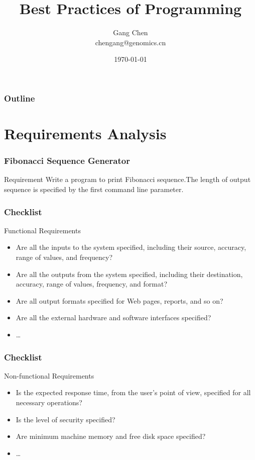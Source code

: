 \documentclass[UTF8]{beamer}
\title{Best Practices of Programming}
\author{Gang Chen\\ chengang@genomics.cn}
\date{\today}
\begin{document}
\begin{frame}
\titlepage
\end{frame}

\begin{frame}[t]\frametitle{Outline}
\tableofcontents[hideallsubsections]
\end{frame}

\section{Requirements Analysis}

\begin{frame}
    \frametitle{Fibonacci Sequence Generator}
\begin{block}{Requirement}
Write a program to print Fibonacci sequence.The length of output sequence is specified by the first command line parameter.
\end{block}
\end{frame}

\begin{frame}
    \frametitle{Checklist}
    \begin{block}{Functional Requirements}
        \begin{itemize}
            \item Are all the inputs to the system specified, including their source, accuracy, range of values, and frequency?
            \item Are all the outputs from the system specified, including their destination, accuracy, range of values, frequency, and format?
            \item Are all output formats specified for Web pages, reports, and so on?
            \item Are all the external hardware and software interfaces specified?
            \item \ldots
        \end{itemize}
    \end{block}
\end{frame}

\begin{frame}
    \frametitle{Checklist}
    \begin{block}{Non-functional Requirements}
        \begin{itemize}
            \item Is the expected response time, from the user’s point of view, specified for all necessary operations?
            \item Is the level of security specified?
            \item Are minimum machine memory and free disk space specified?
            \item \ldots
        \end{itemize}
    \end{block}
\end{frame}
\end{document}
